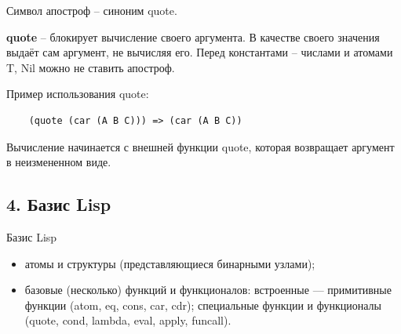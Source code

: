 Символ апостроф -- синоним quote.

\textbf{quote} -- блокирует вычисление своего аргумента. В качестве своего значения выдаёт сам аргумент, не вычисляя его. Перед константами -- числами и атомами T, Nil можно не ставить апостроф.

Пример использования quote:
\begin{lstlisting}
	(quote (car (A B C))) => (car (A B C))
\end{lstlisting}



Вычисление начинается с внешней функции quote, которая возвращает аргумент в неизмененном виде.

\subsection*{4. Базис Lisp}

Базис Lisp 
\begin{itemize}
	\item атомы и структуры (представляющиеся бинарными узлами);
	\item базовые (несколько) функций и функционалов: встроенные — примитивные
	функции (atom, eq, cons, car, cdr); специальные функции и функционалы (quote,
	cond, lambda, eval, apply, funcall).
\end{itemize}

